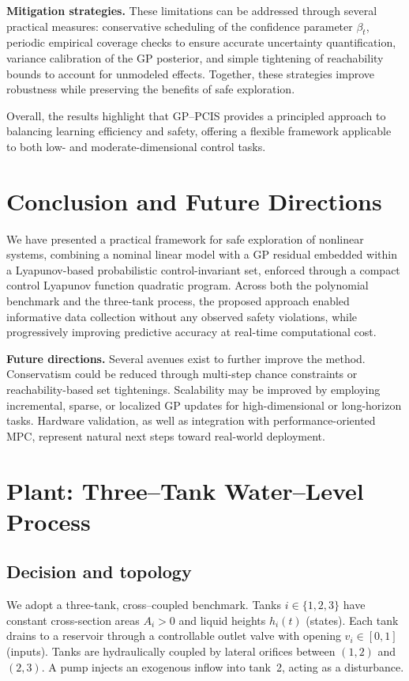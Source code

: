 \documentclass[10pt]{article}
\newcommand{\1}{\mathbbm{1}}
\begin{document}
\textbf{Mitigation strategies.} These limitations can be addressed through several practical measures:  
conservative scheduling of the confidence parameter $\beta_t$, periodic empirical coverage checks to ensure accurate uncertainty quantification, variance calibration of the GP posterior, and simple tightening of reachability bounds to account for unmodeled effects. Together, these strategies improve robustness while preserving the benefits of safe exploration.

Overall, the results highlight that GP--PCIS provides a principled approach to balancing learning efficiency and safety, offering a flexible framework applicable to both low- and moderate-dimensional control tasks.

%
%
\section{Conclusion and Future Directions}
\label{sec:conclusion}

We have presented a practical framework for safe exploration of nonlinear systems, combining a nominal linear model with a GP residual embedded within a Lyapunov-based probabilistic control-invariant set, enforced through a compact control Lyapunov function quadratic program. Across both the polynomial benchmark and the three-tank process, the proposed approach enabled informative data collection without any observed safety violations, while progressively improving predictive accuracy at real-time computational cost.

\textbf{Future directions.} Several avenues exist to further improve the method. Conservatism could be reduced through multi-step chance constraints or reachability-based set tightenings. Scalability may be improved by employing incremental, sparse, or localized GP updates for high-dimensional or long-horizon tasks. Hardware validation, as well as integration with performance-oriented MPC, represent natural next steps toward real-world deployment.

\appendix

\section{Plant: Three--Tank Water--Level Process}\label{sec:plant}

\subsection{Decision and topology}\label{subsec:plant_topology}
We adopt a three-tank, cross–coupled benchmark. Tanks \(i\in\{1,2,3\}\) have constant cross-section areas \(A_i>0\) and liquid heights \(h_i(t)\) (states). Each tank drains to a reservoir through a controllable outlet valve with opening \(v_i\in[0,1]\) (inputs). Tanks are hydraulically coupled by lateral orifices between \((1,2)\) and \((2,3)\). A pump injects an exogenous inflow into tank~2, acting as a disturbance.
\end{document}
